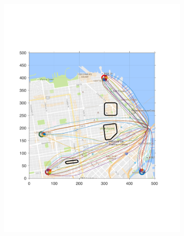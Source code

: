 \begin{figure}[!htb]
\begin{subfigure}{\columnwidth}
  \includegraphics[width=\columnwidth]{figs/sf_d11sep0}
  \label{fig:sf_d11sep0}
\end{subfigure}%


\end{figure}
